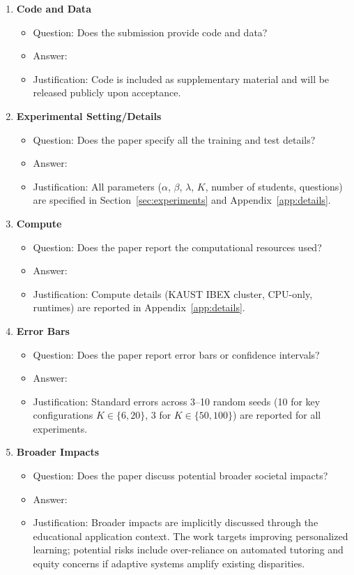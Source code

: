 \documentclass{article}
\begin{document}
\begin{enumerate}
\item {\bf Code and Data}
\begin{itemize}
  \item[] Question: Does the submission provide code and data?
  \item[] Answer: \answerYes{}
  \item[] Justification: Code is included as supplementary material and will be released publicly upon acceptance.
\end{itemize}

\item {\bf Experimental Setting/Details}
\begin{itemize}
  \item[] Question: Does the paper specify all the training and test details?
  \item[] Answer: \answerYes{}
  \item[] Justification: All parameters ($\alpha$, $\beta$, $\lambda$, $K$, number of students, questions) are specified in Section~\ref{sec:experiments} and Appendix~\ref{app:details}.
\end{itemize}

\item {\bf Compute}
\begin{itemize}
  \item[] Question: Does the paper report the computational resources used?
  \item[] Answer: \answerYes{}
  \item[] Justification: Compute details (KAUST IBEX cluster, CPU-only, runtimes) are reported in Appendix~\ref{app:details}.
\end{itemize}

\item {\bf Error Bars}
\begin{itemize}
  \item[] Question: Does the paper report error bars or confidence intervals?
  \item[] Answer: \answerYes{}
  \item[] Justification: Standard errors across 3--10 random seeds (10 for key configurations $K\in\{6,20\}$, 3 for $K\in\{50,100\}$) are reported for all experiments.
\end{itemize}

\item {\bf Broader Impacts}
\begin{itemize}
  \item[] Question: Does the paper discuss potential broader societal impacts?
  \item[] Answer: \answerYes{}
  \item[] Justification: Broader impacts are implicitly discussed through the educational application context. The work targets improving personalized learning; potential risks include over-reliance on automated tutoring and equity concerns if adaptive systems amplify existing disparities.
\end{itemize}


\end{enumerate}
\end{document}
